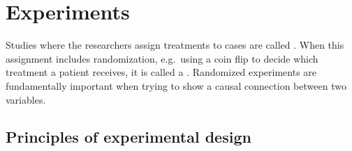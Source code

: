 \section[Experiments]{Experiments }
\label{experimentsSection}

Studies where the researchers assign treatments to cases are called . When this assignment includes randomization, e.g.~using a coin flip to decide which treatment a patient receives, it is called a . Randomized experiments are fundamentally important when trying to show a causal connection between two variables.

\subsection{Principles of experimental design}
\label{experimentalDesignPrinciples}

